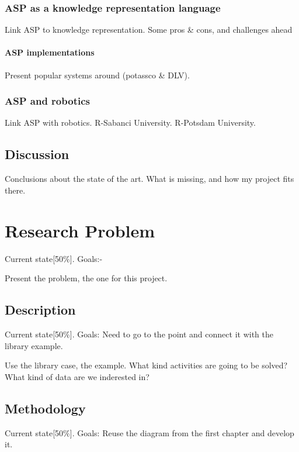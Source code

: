 \documentclass[a4paper, 12pt, openany, oneside]{book}
\begin{document}
\subsection{ASP as a knowledge representation language}
Link ASP to knowledge representation.
Some pros & cons, and challenges ahead

\subsubsection{ASP implementations}
Present popular systems around (potassco & DLV).

\subsection{ASP and robotics}
Link ASP with robotics.
R-Sabanci University.
R-Potsdam University.

\section{Discussion}
Conclusions about the state of the art.
What is missing, and how my project fits there.




\chapter{Research Problem}
Current state[50\%].
Goals:-

Present the problem, the one for this project.

\section{Description}
Current state[50\%].
Goals: Need to go to the point and connect it with the library example.

Use the library case, the example.
What kind activities are going to be solved?
What kind of data are we inderested in?


\section{Methodology}
Current state[50\%].
Goals: Reuse the diagram from the first chapter and develop it.
\end{document}
